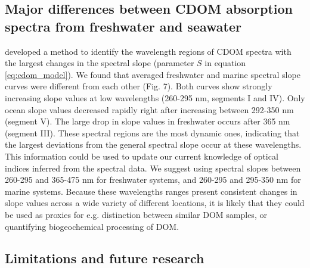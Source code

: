 \subsection*{Major differences between CDOM absorption spectra from freshwater and seawater}

\citet{Loiselle2009} developed a method to identify the wavelength regions of CDOM spectra with the largest changes in the spectral slope (parameter $S$ in equation \ref{eq:cdom_model}). We found that averaged freshwater and marine spectral slope curves were different from each other (Fig. 7). Both curves show strongly increasing slope values at low wavelengths (260-295 nm, segments I and IV). Only ocean slope values decreased rapidly right after increasing between 292-350 nm (segment V). The large drop in slope values in freshwater occurs after 365 nm (segment III). These spectral regions are the most dynamic ones, indicating that the largest deviations from the general spectral slope occur at these wavelengths. This information could be used to update our current knowledge of optical indices inferred from the spectral data. We suggest using spectral slopes between 260-295 and 365-475 nm for freshwater systems, and 260-295 and 295-350 nm for marine systems. Because these wavelengths ranges present consistent changes in slope values across a wide variety of different locations, it is likely that they could be used as proxies for e.g. distinction between similar DOM samples, or quantifying biogeochemical processing of DOM.

\subsection*{Limitations and future research}

